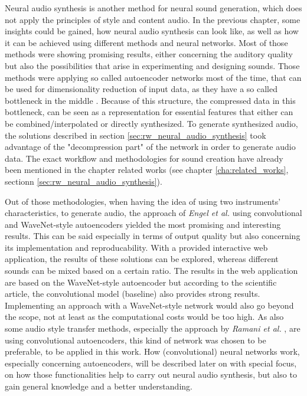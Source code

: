 Neural audio synthesis is another method for neural sound generation, which does not apply the principles of style and content audio. In the previous chapter, some insights could be gained, how neural audio synthesis can look like, as well as how it can be achieved using different methods and neural networks. Most of those methods were showing promising results, either concerning the auditory quality but also the possibilities that arise in experimenting and designing sounds. Those methods were applying so called autoencoder networks most of the time, that can be used for dimensionality reduction of input data, as they have a so called bottleneck in the middle \cite{hinton2006autoencoder}. Because of this structure, the compressed data in this bottleneck, can be seen as a representation for essential features that either can be combined/interpolated or directly synthesized. To generate synthesized audio, the solutions described in section \ref{sec:rw_neural_audio_synthesis} took advantage of the "decompression part" of the network in order to generate audio data. The exact workflow and methodologies for sound creation have already been mentioned in the chapter related works (see chapter \ref{cha:related_works}, sectionn \ref{sec:rw_neural_audio_synthesis}).

Out of those methodologies, when having the idea of using two instruments' characteristics, to generate audio, the approach of \textit{Engel et al.} \cite{Engel2017} using convolutional and WaveNet-style autoencoders yielded the most promising and interesting results. This can be said especially in terms of output quality but also concerning its implementation and reproducability. With a provided interactive web application, the results of these solutions can be explored, whereas different sounds can be mixed based on a certain ratio. The results in the web application are based on the WaveNet-style autoencoder but according to the scientific article, the convolutional model (baseline) also provides strong results. Implementing an approach with a WaveNet-style network would also go beyond the scope, not at least as the computational costs would be too high. As also some audio style transfer methods, especially the approach by \textit{Ramani et al.} \cite{Ramani2018}, are using convolutional autoencoders, this kind of network was chosen to be preferable, to be applied in this work. How (convolutional) neural networks work, especially concerning autoencoders, will be described later on  with special focus, on how those functionalities help to carry out neural audio synthesis, but also to gain general knowledge and a better understanding.

